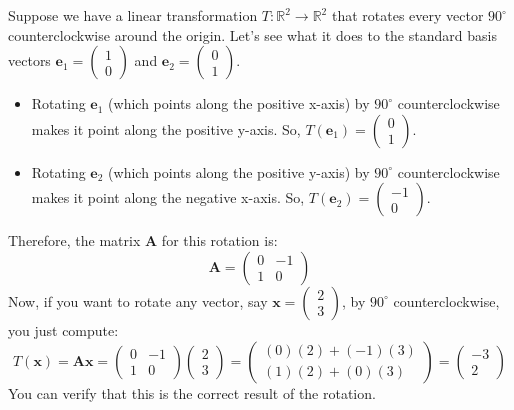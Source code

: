 \documentclass[11pt]{article}
\begin{document}
\begin{example}
    Suppose we have a linear transformation $T: \mathbb{R}^2 \to \mathbb{R}^2$ that rotates every vector $90^\circ$ counterclockwise around the origin.
Let's see what it does to the standard basis vectors $\mathbf{e}_1 = \begin{pmatrix} 1 \\ 0 \end{pmatrix}$ and $\mathbf{e}_2 = \begin{pmatrix} 0 \\ 1 \end{pmatrix}$.
\begin{itemize}
    \item Rotating $\mathbf{e}_1$ (which points along the positive x-axis) by $90^\circ$ counterclockwise makes it point along the positive y-axis. So, $T(\mathbf{e}_1) = \begin{pmatrix} 0 \\ 1 \end{pmatrix}$.
    \item Rotating $\mathbf{e}_2$ (which points along the positive y-axis) by $90^\circ$ counterclockwise makes it point along the negative x-axis. So, $T(\mathbf{e}_2) = \begin{pmatrix} -1 \\ 0 \end{pmatrix}$.
\end{itemize}
Therefore, the matrix $\mathbf{A}$ for this rotation is:
\[ \mathbf{A} = \begin{pmatrix} 0 & -1 \\ 1 & 0 \end{pmatrix} \]
Now, if you want to rotate any vector, say $\mathbf{x} = \begin{pmatrix} 2 \\ 3 \end{pmatrix}$, by $90^\circ$ counterclockwise, you just compute:
\[ T(\mathbf{x}) = \mathbf{A}\mathbf{x} = \begin{pmatrix} 0 & -1 \\ 1 & 0 \end{pmatrix} \begin{pmatrix} 2 \\ 3 \end{pmatrix} = \begin{pmatrix} (0)(2) + (-1)(3) \\ (1)(2) + (0)(3) \end{pmatrix} = \begin{pmatrix} -3 \\ 2 \end{pmatrix} \]
You can verify that this is the correct result of the rotation.
\end{example}
\end{document}
